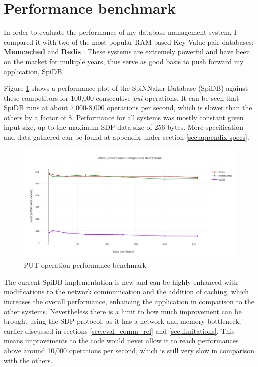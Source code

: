 

\section{Performance benchmark}
In order to evaluate the performance of my database management system, I compared it with two of the most popular RAM-based Key-Value pair databases: \textbf{Memcached} \cite{memcached} and \textbf{Redis} \cite{redis}. These systems are extremely powerful and have been on the market for multiple years, thus serve as good basis to push forward my application, SpiDB.

Figure \ref{fig:write-perf-benchmark} shows a performance plot of the SpiNNaker Database (SpiDB) against these competitors for 100,000 consecutive \textit{put} operations. It can be seen that SpiDB runs at about 7,000-8,000 operations per second, which is slower than the others by a factor of 8. Performance for all systems was mostly constant given input size, up to the maximum SDP data size of 256-bytes. More specification and data gathered can be found at appendix under section \ref{sec:appendix-specs}.

\begin{figure}
\begin{center}
	\includegraphics[width=1.4\textwidth, natwidth=1063, natheight=509]{images/write_performance.png}
\end{center}
\caption{PUT operation performance benchmark}
\label{fig:write-perf-benchmark}
\end{figure}

The current SpiDB implementation is new and can be highly enhanced with modifications to the network communication and the addition of caching, which increases the overall performance, enhancing the application in comparison to the other systems. Nevertheless there is a limit to how much improvement can be brought using the SDP protocol, as it has a network and memory bottleneck, earlier discussed in sections \ref{sec:eval_comm_rel} and \ref{sec:limitations}. This means improvements to the code would never allow it to reach performances above around 10,000 operations per second, which is still very slow in comparison with the others.

